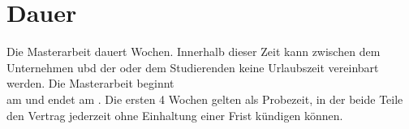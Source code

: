 \section{Dauer}

Die Masterarbeit dauert \thesisTime{} Wochen. Innerhalb dieser Zeit kann zwischen dem Unternehmen ubd der oder dem Studierenden keine Urlaubszeit vereinbart werden.
Die Masterarbeit beginnt \\ am \startDate{} und endet am \endDate{}.
Die ersten 4 Wochen gelten als Probezeit, in der beide Teile den Vertrag jederzeit ohne Einhaltung einer Frist kündigen können.
